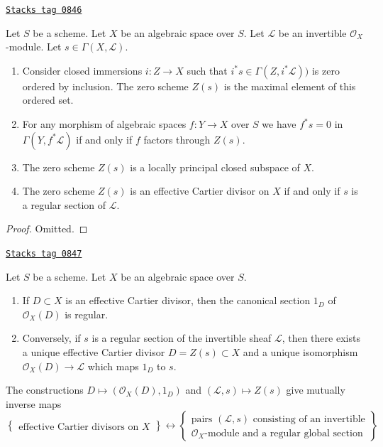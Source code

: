 \begin{lemma}
\label{spaces-divisors-lemma-zero-scheme}
\href{https://stacks.math.columbia.edu/tag/0846}{\texttt{Stacks tag 0846}}

Let $S$ be a scheme. Let $X$ be an algebraic space over $S$.
Let $\mathcal{L}$ be an invertible $\mathcal{O}_X$-module.
Let $s \in \Gamma(X, \mathcal{L})$.
\begin{enumerate}
\item Consider closed immersions $i : Z \to X$ such that
$i^*s \in \Gamma(Z, i^*\mathcal{L}))$ is zero
ordered by inclusion. The zero scheme $Z(s)$ is the
maximal element of this ordered set.
\item For any morphism of algebraic spaces $f : Y \to X$ over $S$
we have $f^*s = 0$ in $\Gamma(Y, f^*\mathcal{L})$ if and only if
$f$ factors through $Z(s)$.
\item The zero scheme $Z(s)$ is a locally principal closed subspace of $X$.
\item The zero scheme $Z(s)$ is an effective Cartier divisor on $X$
if and only if $s$ is a regular section of $\mathcal{L}$.
\end{enumerate}
\end{lemma}

\begin{proof}
Omitted.
\end{proof}

\begin{lemma}[Characterize OD]
\label{spaces-divisors-lemma-characterize-OD}
\href{https://stacks.math.columbia.edu/tag/0847}{\texttt{Stacks tag 0847}}

Let $S$ be a scheme. Let $X$ be an algebraic space over $S$.
\begin{enumerate}
\item If $D \subset X$ is an effective Cartier divisor, then
the canonical section $1_D$ of $\mathcal{O}_X(D)$ is regular.
\item Conversely, if $s$ is a regular section of the invertible
sheaf $\mathcal{L}$, then there exists a unique effective
Cartier divisor $D = Z(s) \subset X$ and a unique isomorphism
$\mathcal{O}_X(D) \to \mathcal{L}$ which maps $1_D$ to $s$.
\end{enumerate}
The constructions
$D \mapsto (\mathcal{O}_X(D), 1_D)$ and $(\mathcal{L}, s) \mapsto Z(s)$
give mutually inverse maps
$$
\left\{
\begin{matrix}
\text{effective Cartier divisors on }X
\end{matrix}
\right\}
\leftrightarrow
\left\{
\begin{matrix}
\text{pairs }(\mathcal{L}, s)\text{ consisting of an invertible}\\
\mathcal{O}_X\text{-module and a regular global section}
\end{matrix}
\right\}
$$
\end{lemma}


